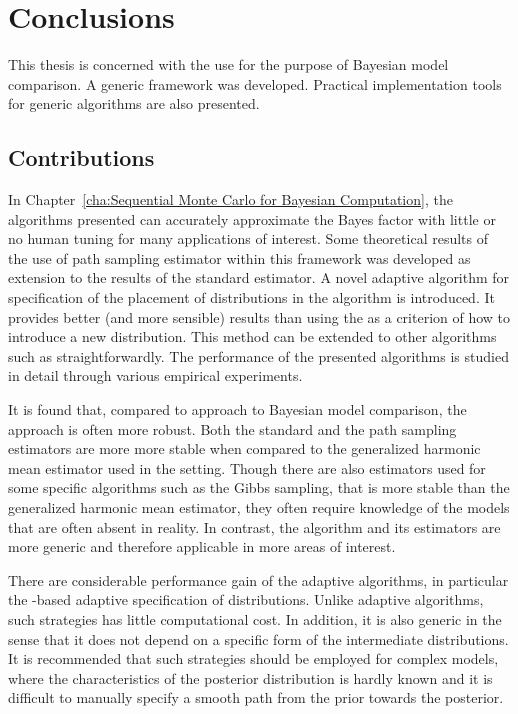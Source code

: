 \chapter{Conclusions}
\label{cha:Conclusions}

This thesis is concerned with the use \smc for the purpose of Bayesian model
comparison. A generic framework was developed. Practical implementation tools
for generic \smc algorithms are also presented.

\section{Contributions}
\label{sec:Contributions}

In Chapter~\ref{cha:Sequential Monte Carlo for Bayesian Computation}, the
algorithms presented can accurately approximate the Bayes factor with little
or no human tuning for many applications of interest. Some theoretical results
of the use of path sampling estimator within this framework was developed as
extension to the results of the standard estimator. A novel adaptive algorithm
for specification of the placement of distributions in the \smc[2] algorithm
is introduced. It provides better (and more sensible) results than using the
\ess as a criterion of how to introduce a new distribution. This method can be
extended to other algorithms such as \smc[3] straightforwardly. The
performance of the presented algorithms is studied in detail through various
empirical experiments.

It is found that, compared to \mcmc approach to Bayesian model comparison, the
\smc approach is often more robust. Both the standard and the path sampling
estimators are more more stable when compared to the generalized harmonic mean
estimator used in the \mcmc setting. Though there are also estimators used for
some specific \mcmc algorithms such as the Gibbs sampling, that is more stable
than the generalized harmonic mean estimator, they often require knowledge of
the models that are often absent in reality. In contrast, the \smc algorithm
and its estimators are more generic and therefore applicable in more areas of
interest.

There are considerable performance gain of the adaptive \smc algorithms, in
particular the \cess-based adaptive specification of distributions. Unlike
adaptive \mcmc algorithms, such strategies has little computational cost. In
addition, it is also generic in the sense that it does not depend on a
specific form of the intermediate distributions. It is recommended that such
strategies should be employed for complex models, where the characteristics of
the posterior distribution is hardly known and it is difficult to manually
specify a smooth path from the prior towards the posterior.

